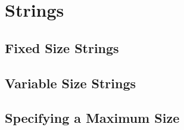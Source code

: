 \section{Strings}
\subsection{Fixed Size Strings}
\subsection{Variable Size Strings}
\subsection{Specifying a Maximum Size}
